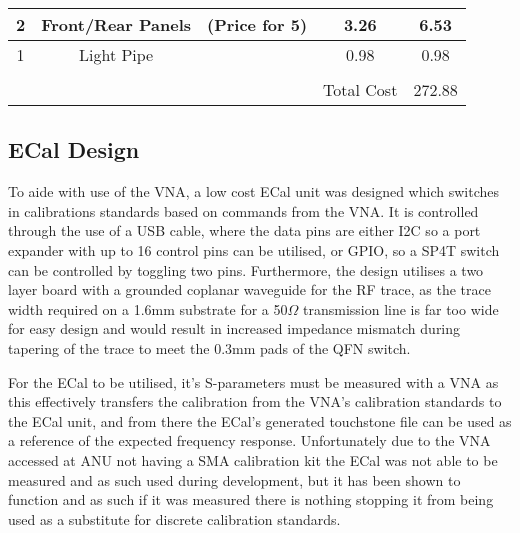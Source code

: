 \begin{table}[h!]
\begin{tabular}{|c|c|c|c|c|}
		2                 & Front/Rear Panels         & (Price for 5)            & 3.26                                                                  & 6.53                                                                      \\ \hline
		1                 & Light Pipe                 &                          & 0.98                                                                   & 0.98                                                                       \\ \hline
		&                            &                          &                                                                        &                                                                            \\ \hline
		&                            &                          & Total Cost                                                             & 272.88                                                                    \\ \hline
	\end{tabular}
\end{table} 

\newpage
\subsection{ECal Design}
To aide with use of the VNA, a low cost ECal unit was designed which switches in calibrations standards based on commands from the VNA. It is controlled through the use of a USB cable, where the data pins are either I2C so a port expander with up to 16 control pins can be utilised, or GPIO, so a SP4T switch can be controlled by toggling two pins. Furthermore, the design utilises a two layer board with a grounded coplanar waveguide for the RF trace, as the trace width required on a 1.6mm substrate for a 50$\Omega$ transmission line is far too wide for easy design and would result in increased impedance mismatch during tapering of the trace to meet the 0.3mm pads of the QFN switch. 

For the ECal to be utilised, it's S-parameters must be measured with a VNA as this effectively transfers the calibration from the VNA's calibration standards to the ECal unit, and from there the ECal's generated touchstone file can be used as a reference of the expected frequency response. Unfortunately due to the VNA accessed at ANU not having a SMA calibration kit the ECal was not able to be measured and as such used during development, but it has been shown to function and as such if it was measured there is nothing stopping it from being used as a substitute for discrete calibration standards.


